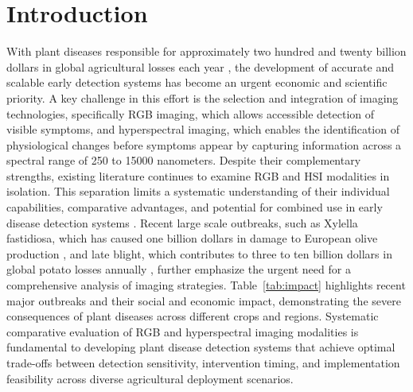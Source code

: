 \documentclass[sn-mathphys]{sn-jnl}
\theoremstyle{thmstyleone}%
\theoremstyle{thmstyletwo}%
\theoremstyle{thmstylethree}%
\begin{document}

\maketitle
\section{Introduction}
\label{sec:intro}

With plant diseases responsible for approximately two hundred and twenty billion dollars in global agricultural losses each year \citep{FAO}, the development of accurate and scalable early detection systems has become an urgent economic and scientific priority. A key challenge in this effort is the selection and integration of imaging technologies, specifically RGB imaging, which allows accessible detection of visible symptoms, and hyperspectral imaging, which enables the identification of physiological changes before symptoms appear by capturing information across a spectral range of 250 to 15000 nanometers. Despite their complementary strengths, existing literature continues to examine RGB and HSI modalities in isolation. This separation limits a systematic understanding of their individual capabilities, comparative advantages, and potential for combined use in early disease detection systems \citep{goodfellow2016deep}. Recent large scale outbreaks, such as Xylella fastidiosa, which has caused one billion dollars in damage to European olive production \citep{coldiretti2021}, and late blight, which contributes to three to ten billion dollars in global potato losses annually \citep{rhouma2024}, further emphasize the urgent need for a comprehensive analysis of imaging strategies. Table~\ref{tab:impact} highlights recent major outbreaks and their social and economic impact, demonstrating the severe consequences of plant diseases across different crops and regions. Systematic comparative evaluation of RGB and hyperspectral imaging modalities is fundamental to developing plant disease detection systems that achieve optimal trade-offs between detection sensitivity, intervention timing, and implementation feasibility across diverse agricultural deployment scenarios.
\end{document}
